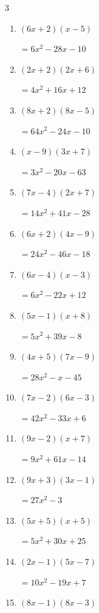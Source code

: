\begin{multicols}{3}
\begin{enumerate}
        $=6x^{2}-30x+36$

\columnbreak %

  \item $(6x+2)(x-5)$

        $=6x^{2}-28x-10$

  \item $(2x+2)(2x+6)$

        $=4x^{2}+16x+12$

  \item $(8x+2)(8x-5)$

        $=64x^{2}-24x-10$

  \item $(x-9)(3x+7)$

        $=3x^{2}-20x-63$

  \item $(7x-4)(2x+7)$

        $=14x^{2}+41x-28$

  \item $(6x+2)(4x-9)$

        $=24x^{2}-46x-18$

  \item $(6x-4)(x-3)$

        $=6x^{2}-22x+12$

  \item $(5x-1)(x+8)$

        $=5x^{2}+39x-8$

  \item $(4x+5)(7x-9)$

        $=28x^{2}-x-45$

  \item $(7x-2)(6x-3)$

        $=42x^{2}-33x+6$

  \item $(9x-2)(x+7)$

        $=9x^{2}+61x-14$

  \item $(9x+3)(3x-1)$

        $=27x^{2}-3$

  \item $(5x+5)(x+5)$

        $=5x^{2}+30x+25$

  \item $(2x-1)(5x-7)$

        $=10x^{2}-19x+7$

  \item $(8x-1)(8x-3)$


\end{enumerate}
\end{multicols}
